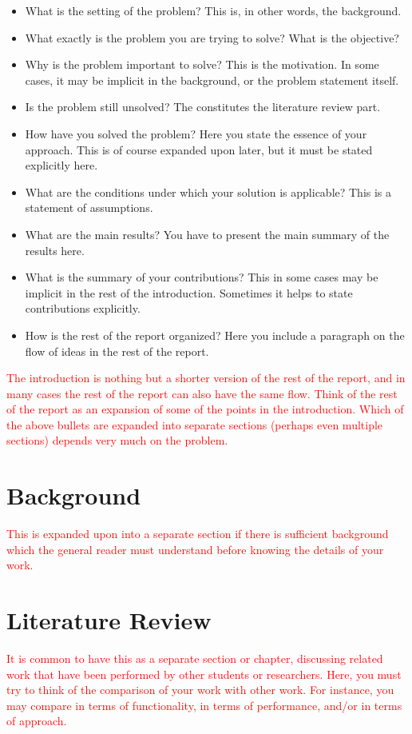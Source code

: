 \documentclass[fyp]{socreport}
\begin{document}
\begin{itemize}
    \color{red}
    \item What is the setting of the problem? This is, in other words, the background.
    \item What exactly is the problem you are trying to solve? What is the objective?
    \item Why is the problem important to solve? This is the motivation. In some cases, it may be implicit in the background, or the problem statement itself.
    \item Is the problem still unsolved? The constitutes the literature review part.
    \item How have you solved the problem? Here you state the essence of your approach. This is of course expanded upon later, but it must be stated explicitly here.
    \item What are the conditions under which your solution is applicable? This is a statement of assumptions.
    \item What are the main results? You have to present the main summary of the results here.
    \item What is the summary of your contributions? This in some cases may be implicit in the rest of the introduction. Sometimes it helps to state contributions explicitly.
    \item How is the rest of the report organized? Here you include a paragraph on the flow of ideas in the rest of the report. 
\end{itemize}

\textcolor{red}{The introduction is nothing but a shorter version of the rest of the report, and in many cases the rest of the report can also have the same flow. Think of the rest of the report as an expansion of some of the points in the introduction. Which of the above bullets are expanded into separate sections (perhaps even multiple sections) depends very much on the problem.
}

\chapter{Background}
\label{ch:background}
\textcolor{red}{This is expanded upon into a separate section if there is sufficient background which the general reader must understand before knowing the details of your work.}

\chapter{Literature Review}
\label{ch:review}
\textcolor{red}{It is common to have this as a separate section or chapter, discussing related work that have been performed by other students or researchers. Here, you must try to think of the comparison of your work with other work. For instance, you may compare in terms of functionality, in terms of performance, and/or in terms of approach.}
\end{document}
